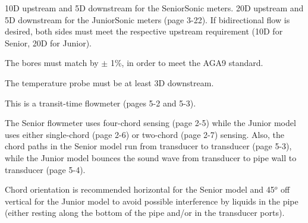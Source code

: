 
10D upstream and 5D downstream for the SeniorSonic meters.  20D upstream and 5D downstream for the JuniorSonic meters (page 3-22).  If bidirectional flow is desired, both sides must meet the respective upstream requirement (10D for Senior, 20D for Junior).

\vskip 10pt

The bores must match by $\pm$ 1\%, in order to meet the AGA9 standard.

\vskip 10pt

The temperature probe must be at least 3D downstream.

\vskip 10pt

This is a transit-time flowmeter (pages 5-2 and 5-3).

\vskip 10pt

The Senior flowmeter uses four-chord sensing (page 2-5) while the Junior model uses either single-chord (page 2-6) or two-chord (page 2-7) sensing.  Also, the chord paths in the Senior model run from transducer to transducer (page 5-3), while the Junior model bounces the sound wave from transducer to pipe wall to transducer (page 5-4).

\vskip 10pt

Chord orientation is recommended horizontal for the Senior model and 45$^{o}$ off vertical for the Junior model to avoid possible interference by liquids in the pipe (either resting along the bottom of the pipe and/or in the transducer ports).




